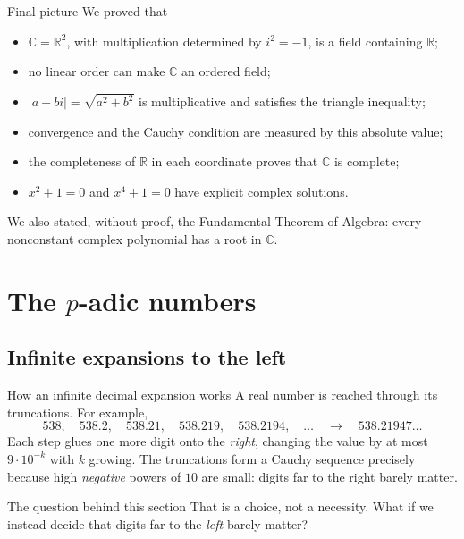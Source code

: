 \documentclass[aspectratio=169,11pt]{beamer}
\newcommand{\R}{\mathbb R}
\newcommand{\C}{\mathbb C}
\begin{document}
\begin{frame}{Final picture}
  We proved that
  \begin{itemize}
    \item \(\C=\R^2\), with multiplication determined by \(i^2=-1\), is a
      field containing \(\R\);
    \item no linear order can make \(\C\) an ordered field;
    \item \(|a+bi|=\sqrt{a^2+b^2}\) is multiplicative and satisfies the
      triangle inequality;
    \item convergence and the Cauchy condition are measured by this absolute
      value;
    \item the completeness of \(\R\) in each coordinate proves that \(\C\)
      is complete;
    \item \(x^2+1=0\) and \(x^4+1=0\) have explicit complex solutions.
  \end{itemize}

  We also stated, without proof, the Fundamental Theorem of Algebra: every
  nonconstant complex polynomial has a root in \(\C\).
\end{frame}

\section{\texorpdfstring{The \(p\)-adic numbers}{The p-adic numbers}}

\subsection{Infinite expansions to the left}

\begin{frame}{How an infinite decimal expansion works}
  A real number is reached through its truncations.  For example,
  \[
    538,\quad
    538.2,\quad
    538.21,\quad
    538.219,\quad
    538.2194,\quad\ldots
    \quad\longrightarrow\quad
    538.21947\ldots
  \]
  Each step glues one more digit onto the \emph{right}, changing the value
  by at most \(9\cdot10^{-k}\) with \(k\) growing.  The truncations form a
  Cauchy sequence precisely because high \emph{negative} powers of \(10\)
  are small: digits far to the right barely matter.

  \begin{alertblock}{The question behind this section}
    That is a choice, not a necessity.  What if we instead decide that
    digits far to the \emph{left} barely matter?
  \end{alertblock}
\end{frame}
\end{document}
